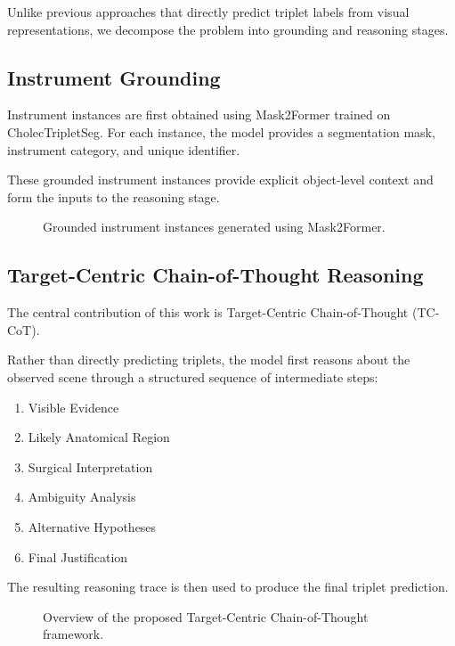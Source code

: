 \documentclass[11pt]{article}
\begin{document}
Unlike previous approaches that directly predict triplet labels from visual representations, we decompose the problem into grounding and reasoning stages.

\subsection{Instrument Grounding}

Instrument instances are first obtained using Mask2Former trained on CholecTripletSeg. For each instance, the model provides a segmentation mask, instrument category, and unique identifier.

These grounded instrument instances provide explicit object-level context and form the inputs to the reasoning stage.

\begin{figure}[t]
\centering
{}
\caption{Grounded instrument instances generated using Mask2Former.}
\label{fig:grounding}
\end{figure}

\subsection{Target-Centric Chain-of-Thought Reasoning}

The central contribution of this work is Target-Centric Chain-of-Thought (TC-CoT).

Rather than directly predicting triplets, the model first reasons about the observed scene through a structured sequence of intermediate steps:

\begin{enumerate}
\item Visible Evidence
\item Likely Anatomical Region
\item Surgical Interpretation
\item Ambiguity Analysis
\item Alternative Hypotheses
\item Final Justification
\end{enumerate}

The resulting reasoning trace is then used to produce the final triplet prediction.

\begin{figure}[t]
\centering
{}
\caption{Overview of the proposed Target-Centric Chain-of-Thought framework.}
\label{fig:tccot}
\end{figure}
\end{document}
